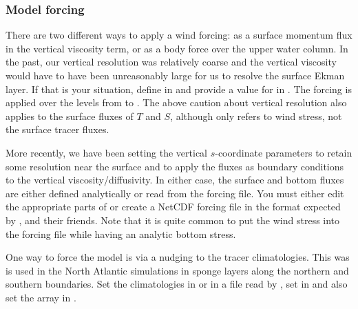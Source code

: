 \subsubsection{Model forcing}
\label{Mforce}

There are two different ways to apply a wind forcing: as a surface
momentum flux in the vertical viscosity term, or as a body force over
the upper water column.  In the past, our vertical resolution was
relatively coarse and the vertical viscosity would have to have been
unreasonably large for us to resolve the surface Ekman layer.  If that
is your situation, define  in  and
provide a value for  in .  The forcing is
applied over the levels from  to .  The above
caution about vertical resolution also applies to the surface fluxes of
$T$ and $S$, although  only refers to wind stress, not
the surface tracer fluxes.

More recently, we have been setting the vertical $s$-coordinate
parameters to retain some resolution near the surface and to apply the
fluxes as boundary conditions to the vertical viscosity/diffusivity.
In either case, the surface and bottom fluxes are either defined
analytically or read from the forcing file.  You must either edit the
appropriate parts of  or create a NetCDF forcing
file in the format expected by , 
and their friends.  Note that it is quite common to put the wind
stress into the forcing file while having an analytic bottom stress.

\smallskip
{}

One way to force the model is via a nudging to the tracer climatologies.
This was is used in the North Atlantic simulations in sponge layers
along the northern and southern boundaries.  Set the climatologies
in  or in a file read by , set
 in  and also
set the array  in .


